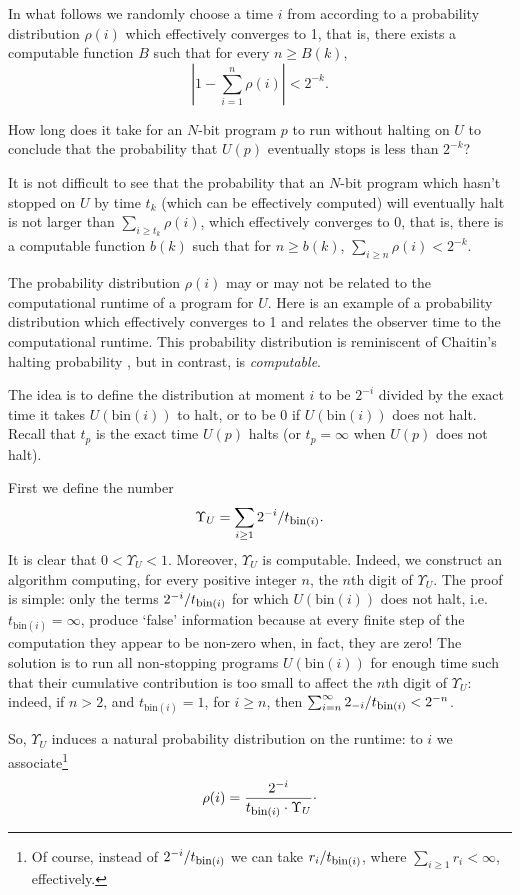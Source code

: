 \documentclass[12pt,twoside,openright]{report}
\newcommand{\bin}{\mbox{bin}}
\newcommand{\fbin}{\mbox{\rm \footnotesize{bin}}}
\begin{document}
In what follows we randomly choose a time $i$  from according to a  probability distribution $\rho(i)$ which effectively converges to 1, that is, there exists a computable function $B$ such that for every $n\ge B(k)$, $$|1-\sum_{i=1}^{n}\rho(i)|< 2^{-k}.$$  

How long does it take for an $N$-bit program $p$ to run without halting on $U$ to conclude that the probability that $U(p)$ eventually stops is less than $2^{-k}$?
 
It is not difficult to see that the probability that an $N$-bit program which hasn't stopped on $U$ by time $t_{k}$ (which can be effectively computed) will eventually halt is not larger than $\sum_{i\ge t_{k}} \rho(i)$, which effectively converges to 0, that is, there is a computable function $b(k)$ such that for $n\ge b(k)$, $\sum_{i\ge n} \rho(i) < 2^{-k}$.
   
The probability distribution $\rho(i)$ may or may not be related to the computational runtime of a program for $U$. Here is an example of a probability distribution which effectively converges  to 1 and relates the observer time to the computational runtime. This probability distribution is reminiscent of Chaitin's halting probability \cite{Calude}, but in contrast, is {\it computable}.

The idea is to define the distribution at moment $i$ to be $2^{-i}$ divided by the exact time it takes $U(\bin(i))$ to halt, or to be 0 if $U(\bin(i))$ does not halt.  Recall that $t_{p}$ is the exact time $U(p)$ halts (or $t_{p}=\infty$ when $U(p)$ does not halt). 

First we define the number
\[\Upsilon_{U}=\sum_{i\ge 1}2^{-i}/t_{\fbin(i)}. \]
It is clear that $0<\Upsilon_{U}<1$. Moreover,  $\Upsilon_{U}$ is computable.  Indeed, we construct an algorithm computing, for every positive integer $n$, the $n$th digit of $\Upsilon_{U}.$ The proof is simple: only the terms $2^{-i}/t_{\fbin(i)}$ for which $U(\bin(i))$ does not halt, i.e.\ $t_{\bin(i)}=\infty$,  produce `false' information because at every finite step of the computation they appear to be non-zero when, in fact, they are zero! The solution is to run all non-stopping programs $U(\bin(i))$ for enough time such that their cumulative contribution is too small to affect the $n$th digit of $\Upsilon_{U}$: indeed, if $n>2$, and $t_{\bin(i)}= 1$, for $i\ge n$, then $\sum_{i=n}^{\infty} 2_{-i}/t_{\fbin(i)}< 2^{-n}$.
 

So,  $\Upsilon_{U}$  induces a natural probability distribution on the runtime: to $i$ we associate\footnote{Of course, instead of $2^{-i}/t_{\fbin(i)}$ we can take $r_i/t_{\fbin(i)}$, where $\sum_{i\ge 1}r_i <\infty$, effectively.}
\begin{equation}
\label{timed}
\rho(i)= \frac{2^{-i}}{t_{\fbin(i)}\cdot \Upsilon_{U}}\raisebox{0.5ex}.
\end{equation}
\end{document}
